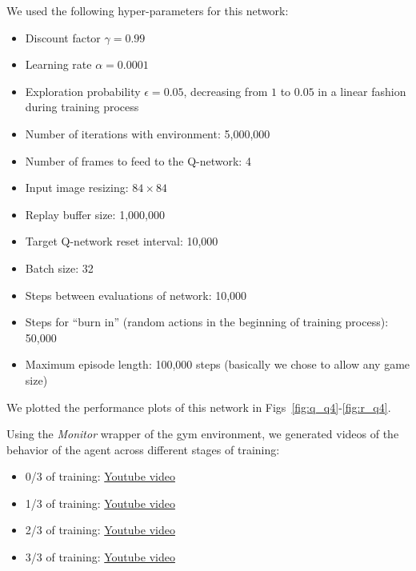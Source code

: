 \documentclass{article}
\begin{document}
We used the following hyper-parameters for this network:
\begin{itemize}
  \item Discount factor $\gamma=0.99$
  \item Learning rate $\alpha=0.0001$
  \item Exploration probability $\epsilon=0.05$, decreasing from $1$ to $0.05$ in a linear fashion during training process
  \item Number of iterations with environment: 5,000,000
  \item Number of frames to feed to the Q-network: 4
  \item Input image resizing: $84\times84$
  \item Replay buffer size: 1,000,000
  \item Target Q-network reset interval: 10,000
  \item Batch size: 32
  \item Steps between evaluations of network: 10,000
  \item Steps for ``burn in'' (random actions in the beginning of training process): 50,000
  \item Maximum episode length: 100,000 steps (basically we chose to allow any game size)
\end{itemize}

We plotted the performance plots of this network in Figs~\ref{fig:q_q4}-\ref{fig:r_q4}.



Using the \textit{Monitor} wrapper of the gym environment, we generated videos of the behavior of the agent across different stages of training:

\begin{itemize}
  \item 0/3 of training: \href{http://www.sharelatex.com}{Youtube video}
  \item 1/3 of training: \href{http://www.sharelatex.com}{Youtube video}
  \item 2/3 of training: \href{http://www.sharelatex.com}{Youtube video}
  \item 3/3 of training: \href{http://www.sharelatex.com}{Youtube video}
\end{itemize}
\end{document}

